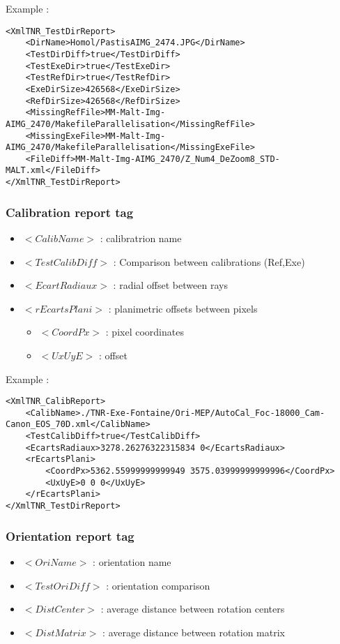 \documentclass[a4paper]{book}
\begin{document}
Example : 
\begin{lstlisting}
<XmlTNR_TestDirReport>
	<DirName>Homol/PastisAIMG_2474.JPG</DirName>
	<TestDirDiff>true</TestDirDiff>
	<TestExeDir>true</TestExeDir>
	<TestRefDir>true</TestRefDir>
	<ExeDirSize>426568</ExeDirSize>
	<RefDirSize>426568</RefDirSize>
	<MissingRefFile>MM-Malt-Img-AIMG_2470/MakefileParallelisation</MissingRefFile>
	<MissingExeFile>MM-Malt-Img-AIMG_2470/MakefileParallelisation</MissingExeFile>
	<FileDiff>MM-Malt-Img-AIMG_2470/Z_Num4_DeZoom8_STD-MALT.xml</FileDiff>
</XmlTNR_TestDirReport>
\end{lstlisting}

\subsubsection{Calibration report tag}
\begin{itemize}
\item $<CalibName>$ : calibratrion name
\item $<TestCalibDiff>$ : Comparison between calibrations (Ref,Exe)
\item $<EcartRadiaux>$ : radial offset between rays
\item $<rEcartsPlani>$ : planimetric offsets between pixels
\begin{itemize}
\item $<CoordPx>$ : pixel coordinates
\item $<UxUyE>$ : offset\\
\end{itemize}
\end{itemize}

Example :
\begin{lstlisting}
<XmlTNR_CalibReport>
	<CalibName>./TNR-Exe-Fontaine/Ori-MEP/AutoCal_Foc-18000_Cam-Canon_EOS_70D.xml</CalibName>
	<TestCalibDiff>true</TestCalibDiff>
	<EcartsRadiaux>3278.26276322315834 0</EcartsRadiaux>
	<rEcartsPlani>
		<CoordPx>5362.55999999999949 3575.03999999999996</CoordPx>
		<UxUyE>0 0 0</UxUyE>
	</rEcartsPlani>
</XmlTNR_TestDirReport>
\end{lstlisting}

\subsubsection{Orientation report tag}
\begin{itemize}
\item $<OriName>$ : orientation name
\item $<TestOriDiff>$ : orientation comparison
\item $<DistCenter>$ : average distance between rotation centers
\item $<DistMatrix>$ : average distance between rotation matrix\\
\end{itemize}
\end{document}
